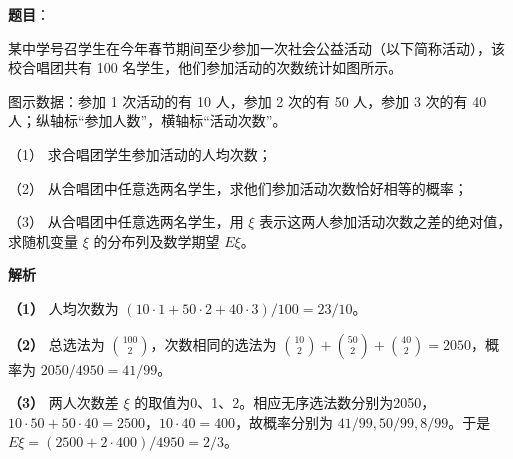 \begin{answer}

\textbf{题目}：

某中学号召学生在今年春节期间至少参加一次社会公益活动（以下简称活动），该校合唱团共有 100 名学生，他们参加活动的次数统计如图所示。

图示数据：参加 1 次活动的有 10 人，参加 2 次的有 50 人，参加 3 次的有 40 人；纵轴标“参加人数”，横轴标“活动次数”。

（1） 求合唱团学生参加活动的人均次数；

（2） 从合唱团中任意选两名学生，求他们参加活动次数恰好相等的概率；

（3） 从合唱团中任意选两名学生，用 $\xi$ 表示这两人参加活动次数之差的绝对值，求随机变量 $\xi$ 的分布列及数学期望 $E\xi$。
\nopagebreak[4]
\begin{center}\end{center}
\nopagebreak[4]
\textbf{解析}

\textbf{（1）} 人均次数为 $(10\cdot1+50\cdot2+40\cdot3)/100=23/10$。

\textbf{（2）} 总选法为 $\binom{100}{2}$，次数相同的选法为 $\binom{10}{2}+\binom{50}{2}+\binom{40}{2}=2050$，概率为 $2050/4950=41/99$。

\textbf{（3）} 两人次数差 $\xi$ 的取值为0、1、2。相应无序选法数分别为2050，$10\cdot50+50\cdot40=2500$，$10\cdot40=400$，故概率分别为 $41/99,50/99,8/99$。于是 $E\xi=(2500+2\cdot400)/4950=2/3$。




\end{answer}
